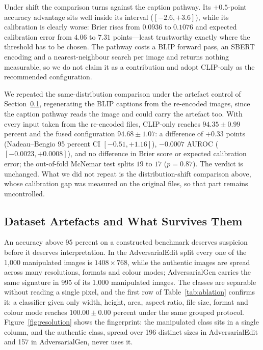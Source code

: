 Under shift the comparison turns against the caption pathway. Its
$+0.5$-point accuracy advantage sits well inside its interval
($[-2.6, +3.6]$), while its calibration is clearly worse: Brier rises from
$0.0936$ to $0.1076$ and expected calibration error from $4.06$ to $7.31$
points---least trustworthy exactly where the threshold has to be chosen. The
pathway costs a BLIP forward pass, an SBERT encoding and a nearest-neighbour
search per image and returns nothing measurable, so we do not claim it as a
contribution and adopt CLIP-only as the recommended configuration.

We repeated the same-distribution comparison under the artefact control of
Section~\ref{sec:artefact}, regenerating the BLIP captions from the re-encoded
images, since the caption pathway reads the image and could carry the artefact
too. With every input taken from the re-encoded files, CLIP-only reaches
$94.35 \pm 0.99$ percent and the fused configuration $94.68 \pm 1.07$: a
difference of $+0.33$ points (Nadeau--Bengio 95 percent CI $[-0.51, +1.16]$),
$-0.0007$ AUROC ($[-0.0023, +0.0008]$), and no difference in Brier score or
expected calibration error; the out-of-fold McNemar test splits $19$ to $17$
($p = 0.87$). The verdict is unchanged. What we did not repeat is the
distribution-shift comparison above, whose calibration gap was measured on the
original files, so that part remains uncontrolled.

\subsection{Dataset Artefacts and What Survives Them}
\label{sec:artefact}

An accuracy above 95 percent on a constructed benchmark deserves suspicion
before it deserves interpretation. In the AdversarialEdit split every one of
the 1{,}000 manipulated images is $1408 \times 768$, while the authentic images
are spread across many resolutions, formats and colour modes; AdversarialGen
carries the same signature in 995 of its 1{,}000 manipulated images. The
classes are separable without reading a single pixel, and the first row of
Table~\ref{tab:ablation} confirms it: a classifier given only width, height,
area, aspect ratio, file size, format and colour mode reaches
$100.00 \pm 0.00$ percent under the same grouped protocol.
Figure~\ref{fig:resolution} shows the fingerprint: the manipulated class sits in
a single column, and the authentic class, spread over 196 distinct sizes in
AdversarialEdit and 157 in AdversarialGen, never uses it.

